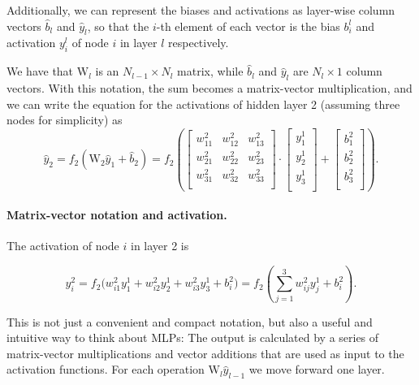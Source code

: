 \documentclass[%
oneside,                 %
final,                   %
10pt]{article}
\begin{document}
Additionally, we can represent the biases and activations
as layer-wise column vectors $\hat{b}_l$ and $\hat{y}_l$, so that the $i$-th element of each vector 
is the bias $b_i^l$ and activation $y_i^l$ of node $i$ in layer $l$ respectively. 

We have that $\mathrm{W}_l$ is an $N_{l-1} \times N_l$ matrix, while $\hat{b}_l$ and $\hat{y}_l$ are $N_l \times 1$ column vectors. 
With this notation, the sum becomes a matrix-vector multiplication, and we can write
the equation for the activations of hidden layer 2 (assuming three nodes for simplicity) as
\begin{equation}
 \hat{y}_2 = f_2(\mathrm{W}_2 \hat{y}_{1} + \hat{b}_{2}) = 
 f_2\left(\left[\begin{array}{ccc}
    w^2_{11} &w^2_{12} &w^2_{13} \\
    w^2_{21} &w^2_{22} &w^2_{23} \\
    w^2_{31} &w^2_{32} &w^2_{33} \\
    \end{array} \right] \cdot
    \left[\begin{array}{c}
           y^1_1 \\
           y^1_2 \\
           y^1_3 \\
          \end{array}\right] + 
    \left[\begin{array}{c}
           b^2_1 \\
           b^2_2 \\
           b^2_3 \\
          \end{array}\right]\right).
\end{equation}

\paragraph{Matrix-vector notation  and activation.}
The activation of node $i$ in layer 2 is

\begin{equation}
 y^2_i = f_2\Bigr(w^2_{i1}y^1_1 + w^2_{i2}y^1_2 + w^2_{i3}y^1_3 + b^2_i\Bigr) = 
 f_2\left(\sum_{j=1}^3 w^2_{ij} y_j^1 + b^2_i\right).
\end{equation}

This is not just a convenient and compact notation, but also a useful
and intuitive way to think about MLPs: The output is calculated by a
series of matrix-vector multiplications and vector additions that are
used as input to the activation functions. For each operation
$\mathrm{W}_l \hat{y}_{l-1}$ we move forward one layer.
\end{document}
